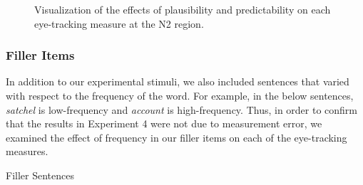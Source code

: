 \documentclass[
  12pt,
  letterpaper,
]{scrreport}
\begin{document}
\begin{figure}[htbp]

\caption{\label{fig-fullmodelresultsn2}Visualization of the effects of
plausibility and predictability on each eye-tracking measure at the N2
region.}


\end{figure}%

\subsubsection{Filler Items}\label{filler-items}

In addition to our experimental stimuli, we also included sentences that
varied with respect to the frequency of the word. For example, in the
below sentences, \emph{satchel} is low-frequency and \emph{account} is
high-frequency. Thus, in order to confirm that the results in Experiment
4 were not due to measurement error, we examined the effect of frequency
in our filler items on each of the eye-tracking measures.

\begin{exe}
\ex Filler Sentences \label{fillers}
\begin{xlist}
\end{xlist}
\end{exe}
\end{document}

